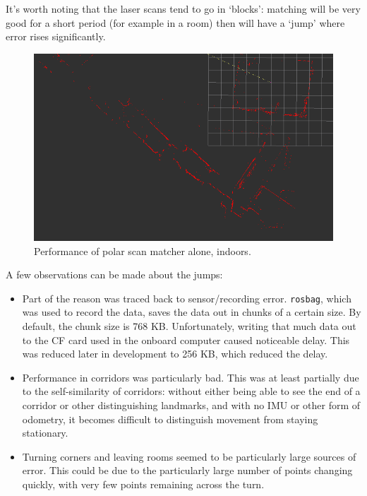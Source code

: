 \documentclass[12pt,oneside,a4paper,draft]{book}
\begin{document}
It's worth noting that the laser scans tend to go in `blocks':
matching will be very good for a short period (for example in a room)
then will have a `jump' where error rises significantly.

\begin{figure}[h!]
  \centering
  \includegraphics[width=\textwidth]{figs/indoor}
  \caption{Performance of polar scan matcher alone, indoors.}
  \label{fig:psm-indoors}
\end{figure}

A few observations can be made about the jumps:
\begin{itemize}
\item Part of the reason was traced back to sensor/recording
  error. \texttt{rosbag}, which was used to record the data, saves the
  data out in chunks of a certain size. By default, the chunk size is
  768 KB. Unfortunately, writing that much data out to the CF card
  used in the onboard computer caused noticeable delay. This was
  reduced later in development to 256 KB, which reduced the delay.
\item Performance in corridors was particularly bad. This was at least
  partially due to the self-similarity of corridors: without either
  being able to see the end of a corridor or other distinguishing
  landmarks, and with no IMU or other form of odometry, it becomes
  difficult to distinguish movement from staying stationary.
\item Turning corners and leaving rooms seemed to be particularly
  large sources of error. This could be due to the particularly large
  number of points changing quickly, with very few points remaining
  across the turn.
\end{itemize}
\end{document}
